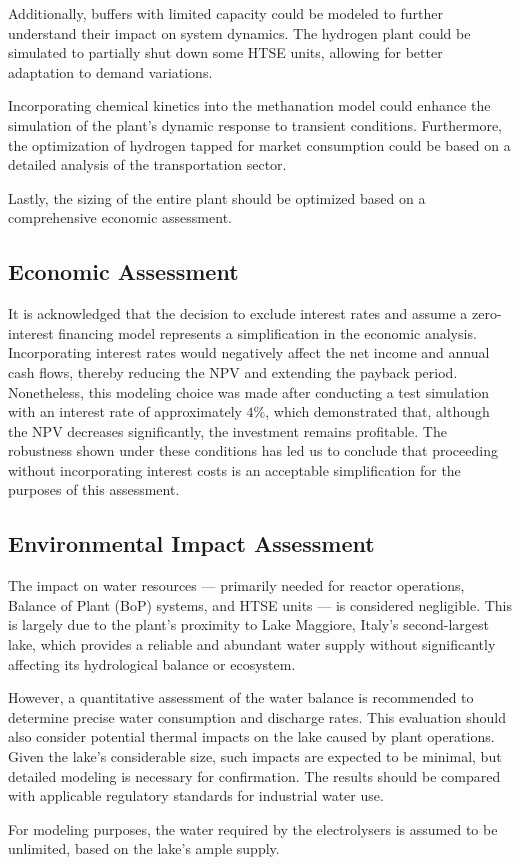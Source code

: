 Additionally, buffers with limited capacity could be modeled to further understand their impact on system dynamics. The hydrogen plant could be simulated to partially shut down some HTSE units, allowing for better adaptation to demand variations.

Incorporating chemical kinetics into the methanation model could enhance the simulation of the plant's dynamic response to transient conditions. Furthermore, the optimization of hydrogen tapped for market consumption could be based on a detailed analysis of the transportation sector.

Lastly, the sizing of the entire plant should be optimized based on a comprehensive economic assessment.

\subsection{Economic Assessment}
It is acknowledged that the decision to exclude interest rates and assume a zero-interest financing model represents a simplification in the economic analysis. Incorporating interest rates would negatively affect the net income and annual cash flows, thereby reducing the NPV and extending the payback period. Nonetheless, this modeling choice was made after conducting a test simulation with an interest rate of approximately $4\%$, which demonstrated that, although the NPV decreases significantly, the investment remains profitable. The robustness shown under these conditions has led us to conclude that proceeding without incorporating interest costs is an acceptable simplification for the purposes of this assessment.

\subsection{Environmental Impact Assessment}
The impact on water resources — primarily needed for reactor operations, Balance of Plant (BoP) systems, and HTSE units — is considered negligible. 
This is largely due to the plant's proximity to Lake Maggiore, Italy's second-largest lake, which provides a reliable and abundant water supply without significantly affecting its
hydrological balance or ecosystem.

However, a quantitative assessment of the water balance is recommended to determine precise water consumption and discharge rates. This evaluation should also consider potential 
thermal impacts on the lake caused by plant operations. Given the lake's considerable size, such impacts are expected to be minimal, but detailed modeling is necessary for confirmation. 
The results should be compared with applicable regulatory standards for industrial water use.

For modeling purposes, the water required by the electrolysers is assumed to be unlimited, based on the lake's ample supply.